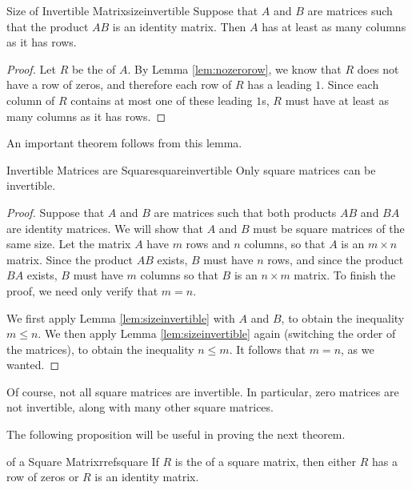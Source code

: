 \begin{lemma}{Size of Invertible Matrix}{sizeinvertible}
Suppose that $A$ and $B$ are matrices such that the product $AB$ is an identity matrix. Then $A$ has at least as many columns as it has rows.
\end{lemma}
\ifdefined\showproofs
\begin{proof}
Let $R$ be the \rref \;of $A$. By Lemma \ref{lem:nozerorow}, we know that $R$ does not have a row of zeros, and therefore each row of $R$ has a leading $1$. Since each column of $R$ contains at most one of these leading $1$s, $R$ must have at least as many columns as it has rows.
\end{proof}
\fi

An important theorem follows from this lemma. 

\begin{theorem}{Invertible Matrices are Square}{squareinvertible}
Only square matrices can be invertible.
\end{theorem}

\ifdefined\showproofs
\begin{proof}
Suppose that $A$ and $B$ are matrices such that both products $AB$ and $BA$ are identity matrices. We will show that $A$ and $B$ must be square matrices of the same size. Let the matrix $A$ have $m$ rows and $n$ columns, so that $A$ is an $m \times n$ matrix. Since the product $AB$ exists, $B$ must have $n$ rows, and since the product $BA$ exists, $B$ must have $m$ columns so that $B$ is an $n \times m$ matrix. To finish the proof, we need only verify that $m=n$. 

We first apply Lemma \ref{lem:sizeinvertible} with $A$ and $B$, to obtain the inequality $m \leq n$. We then apply Lemma \ref{lem:sizeinvertible} again (switching the order of the matrices), to obtain the inequality $n \leq m$. It follows that $m=n$, as we wanted.
\end{proof}
\fi

Of course, not all square matrices are invertible. In particular, zero matrices are not invertible, along with many other square matrices. 

The following proposition will be useful in proving the next theorem.

\begin{proposition}{\RREF of a Square Matrix}{rrefsquare}
If $R$ is the \rref \;of a square matrix, then either $R$ has a row of zeros or $R$ is an identity matrix. 
\end{proposition}

